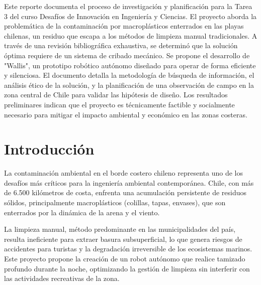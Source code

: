 \begin{abstractd}
	Este reporte documenta el proceso de investigación y planificación para la Tarea 3 del curso Desafíos de Innovación en Ingeniería y Ciencias. El proyecto aborda la problemática de la contaminación por macroplásticos enterrados en las playas chilenas, un residuo que escapa a los métodos de limpieza manual tradicionales. A través de una revisión bibliográfica exhaustiva, se determinó que la solución óptima requiere de un sistema de cribado mecánico. Se propone el desarrollo de "Wallis", un prototipo robótico autónomo diseñado para operar de forma eficiente y silenciosa. El documento detalla la metodología de búsqueda de información, el análisis ético de la solución, y la planificación de una observación de campo en la zona central de Chile para validar las hipótesis de diseño. Los resultados preliminares indican que el proyecto es técnicamente factible y socialmente necesario para mitigar el impacto ambiental y económico en las zonas costeras.
\end{abstractd}

\newpage
\section{Introducción}
La contaminación ambiental en el borde costero chileno representa uno de los desafíos más críticos para la ingeniería ambiental contemporánea. Chile, con más de 6.500 kilómetros de costa, enfrenta una acumulación persistente de residuos sólidos, principalmente macroplásticos (colillas, tapas, envases), que son enterrados por la dinámica de la arena y el viento.

La limpieza manual, método predominante en las municipalidades del país, resulta ineficiente para extraer basura subsuperficial, lo que genera riesgos de accidentes para turistas y la degradación irreversible de los ecosistemas marinos. Este proyecto propone la creación de un robot autónomo que realice tamizado profundo durante la noche, optimizando la gestión de limpieza sin interferir con las actividades recreativas de la zona.


